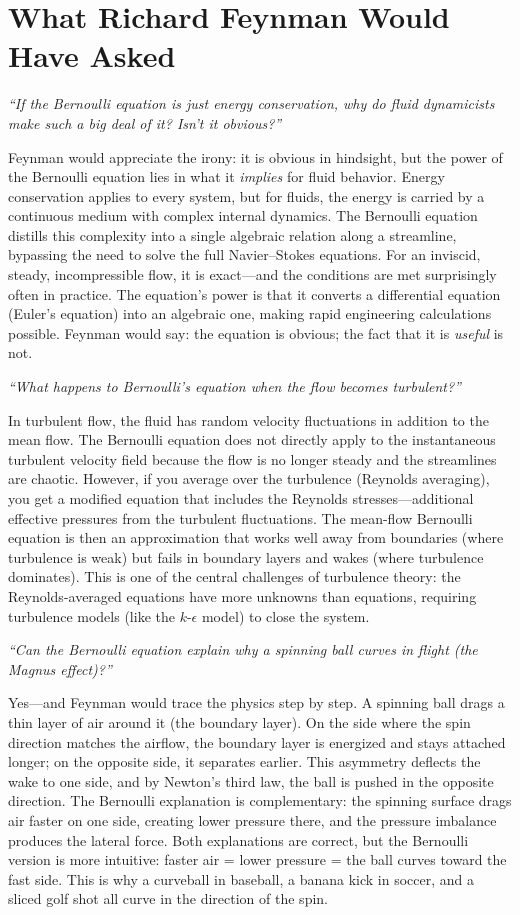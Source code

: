 \section*{What Richard Feynman Would Have Asked}

\textit{``If the Bernoulli equation is just energy conservation, why do fluid dynamicists make such a big deal of it? Isn't it obvious?''}

Feynman would appreciate the irony: it is obvious in hindsight, but the power of the Bernoulli equation lies in what it \emph{implies} for fluid behavior. Energy conservation applies to every system, but for fluids, the energy is carried by a continuous medium with complex internal dynamics. The Bernoulli equation distills this complexity into a single algebraic relation along a streamline, bypassing the need to solve the full Navier--Stokes equations. For an inviscid, steady, incompressible flow, it is exact---and the conditions are met surprisingly often in practice. The equation's power is that it converts a differential equation (Euler's equation) into an algebraic one, making rapid engineering calculations possible. Feynman would say: the equation is obvious; the fact that it is \emph{useful} is not.

\textit{``What happens to Bernoulli's equation when the flow becomes turbulent?''}

In turbulent flow, the fluid has random velocity fluctuations in addition to the mean flow. The Bernoulli equation does not directly apply to the instantaneous turbulent velocity field because the flow is no longer steady and the streamlines are chaotic. However, if you average over the turbulence (Reynolds averaging), you get a modified equation that includes the Reynolds stresses---additional effective pressures from the turbulent fluctuations. The mean-flow Bernoulli equation is then an approximation that works well away from boundaries (where turbulence is weak) but fails in boundary layers and wakes (where turbulence dominates). This is one of the central challenges of turbulence theory: the Reynolds-averaged equations have more unknowns than equations, requiring turbulence models (like the $k$-$\epsilon$ model) to close the system.

\textit{``Can the Bernoulli equation explain why a spinning ball curves in flight (the Magnus effect)?''}

Yes---and Feynman would trace the physics step by step. A spinning ball drags a thin layer of air around it (the boundary layer). On the side where the spin direction matches the airflow, the boundary layer is energized and stays attached longer; on the opposite side, it separates earlier. This asymmetry deflects the wake to one side, and by Newton's third law, the ball is pushed in the opposite direction. The Bernoulli explanation is complementary: the spinning surface drags air faster on one side, creating lower pressure there, and the pressure imbalance produces the lateral force. Both explanations are correct, but the Bernoulli version is more intuitive: faster air = lower pressure = the ball curves toward the fast side. This is why a curveball in baseball, a banana kick in soccer, and a sliced golf shot all curve in the direction of the spin.

